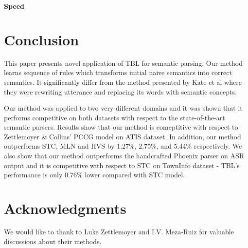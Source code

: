 \documentclass{article}
\begin{document}
\textbf{Speed}

\section{Conclusion}

This paper presents novel application of TBL for semantic parsing. Our method learns sequence of rules which transforms initial naive semantics into correct semantics. It significantly differ from the method presented by Kate et al \cite{kate05} where they were rewriting utterance and replacing its words with semantic concepts. 

Our method was applied to two very different domains and it was shown that it performs competitive on both datasets with respect to the state-of-the-art semantic parsers. Results show that our method is comeptitive with respect to Zettlemoyer \& Collins' PCCG model \cite{zettlemoyer07} on ATIS dataset. In addition, our method outperforms STC, MLN and HVS by 1.27\%, 2.75\%, and 5.44\% respectively. We also show that our method outperforms the handcrafted Phoenix parser on ASR output and it is competitive with respect to STC on TownInfo dataset - TBL's performance is only 0.76\% lower compared with STC model.


\section{Acknowledgments}

We would like to thank to Luke Zettlemoyer and I.V. Meza-Ruiz for valuable discussions about their methods.

\eightpt


\end{document}
